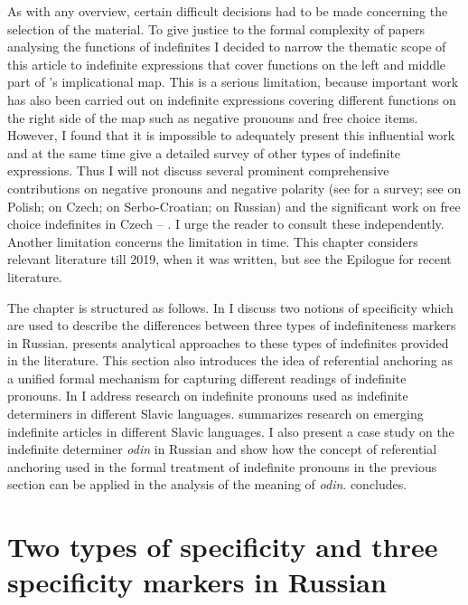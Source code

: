 \documentclass[output=paper,colorlinks,citecolor=brown]{langscibook}
\begin{document}
As with any overview, certain difficult decisions had to be made concerning the selection of the material. To give justice to the formal complexity of papers analysing the functions of indefinites I decided to narrow the thematic scope of this article to indefinite expressions that cover functions on the left and middle part of \citeauthor{Haspelmath1997}’s implicational map. This is a serious limitation, because important work has also been carried out on indefinite expressions covering different functions on the right side of the map such as negative pronouns and free choice items. However, I found that it is impossible to adequately present this influential work and at the same time give a detailed survey of other types of indefinite expressions. Thus I will not discuss several prominent comprehensive contributions on negative pronouns and negative polarity (see  for a survey; see \citealt{Blaszczak2001,Blaszczak2003} on Polish; \citealt{Docekal2011} on Czech; \citealt{Progovac1993a} on Serbo-Croatian; \citealt{Pereltsvaig2000,Pereltsvaig2004} on Russian) and the significant work on free choice indefinites in Czech -- \citet{Strachonova2016}. I urge the reader to consult these independently. Another limitation concerns the limitation in time. This chapter considers relevant literature till 2019, when it was written, but see the Epilogue for recent literature.

\largerpage
The chapter is structured as follows. In  I discuss two notions of specificity which are used to describe the differences between three types of indefiniteness markers in Russian.  presents analytical approaches to these types of indefinites provided in the literature. This section also introduces the idea of referential anchoring as a unified formal mechanism for capturing different readings of indefinite pronouns. In  I address research on indefinite pronouns used as indefinite determiners in different Slavic languages.  summarizes research on emerging indefinite articles in different Slavic languages. I also present a case study on the indefinite determiner \textit{odin} in Russian and show how the concept of referential anchoring used in the formal treatment of indefinite pronouns in the previous section can be applied in the analysis of the meaning of \textit{odin}.  concludes.   

\section{Two types of specificity and three specificity markers in Russian}\label{geist:sec:2}
\end{document}
